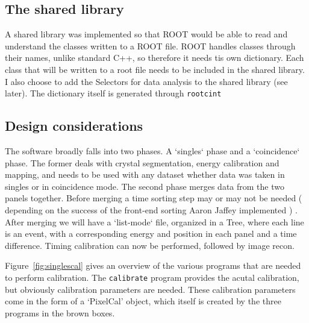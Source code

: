 \documentclass[12pt]{article}
\begin{document}
\subsection{The shared library}
A shared library was implemented so that ROOT would be able to read and understand the classes written to a ROOT file. ROOT handles classes through their names, unlike standard C++, so therefore it needs tis own dictionary. Each class that will be written to a root file needs to be included in the shared library. I also choose to add the Selectors for data analysis to the shared library (see later). The dictionary itself is generated through {\tt rootcint}

\subsection{Design considerations}
The software broadly falls into two phases. A `singles` phase and a `coincidence` phase. The former deals with crystal segmentation, energy calibration and mapping, and needs to be used with any dataset whether data was taken in singles or in coincidence mode. The second phase merges data from the two panels together. Before merging a time sorting step may or may not be needed ( depending on the success of the front-end sorting Aaron Jaffey implemented ) . After merging we will have a `list-mode` file, organized in a Tree, where each line is an event, with a corresponding energy and position in each panel and a time difference. Timing calibration can now be performed, followed by image recon.

Figure~\ref{fig:singlescal} gives an overview of the various programs that are needed to perform calibration. The {\tt calibrate} program provides the acutal calibration, but obviously calibration parameters are needed. These calibration parameters come in the form of a `PixelCal' object, which itself is created by the three programs in the brown boxes. 
\end{document}
